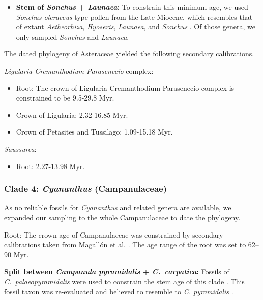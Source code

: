 \documentclass[10pt]{article}
\begin{document}
\begin{itemize}
\item \textbf{Stem of \textit{Sonchus} + \textit{Launaea}:} To
  constrain this minimum age, we used \textit{Sonchus oleraceus}-type
  pollen from the Late Miocene, which resembles that of extant
  \textit{Aetheorhiza}, \textit{Hyoseris}, \textit{Launaea}, and
  \textit{Sonchus} \citep{Blackmore1986}. Of those genera, we only
  sampled \textit{Sonchus} and \textit{Launaea}.

\end{itemize}

The dated phylogeny of Asteraceae yielded the following secondary
calibrations. %

\textit{Ligularia-Cremanthodium-Parasenecio} complex: 


\begin{itemize}

\item Root: The crown of Ligularia-Cremanthodium-Parasenecio complex
  is constrained to be 9.5-29.8 Myr.

\item Crown of Ligularia: 2.32-16.85 Myr.

\item Crown of Petasites and Tussilago: 1.09-15.18 Myr.

\end{itemize}


\textit{Saussurea}:

\begin{itemize}
\item Root: 2.27-13.98 Myr. %
\end{itemize}

\subsubsection*{Clade 4: \textit{Cyananthus} (Campanulaceae)}

As no reliable fossils for \textit{Cyananthus} and related genera are
available, we expanded our sampling to the whole Campanulaceae to date
the phylogeny.

Root: The crown age of Campanulaceae was constrained by secondary
calibrations taken from Magallón et al. \citep{Magallon2015}. The age
range of the root was set to 62--90 Myr.

\textbf{Split between \textit{Campanula pyramidalis} +
  \textit{C.~carpatica}:} Fossils of \textit{C.~palaeopyramidalis}
were used to constrain the stem age of this clade
\citep{Lancucka-Srodoniowa1979}. This fossil taxon was re-evaluated
and believed to resemble to \textit{C. pyramidalis}
\citep{Cellinese2009}.
\end{document}
